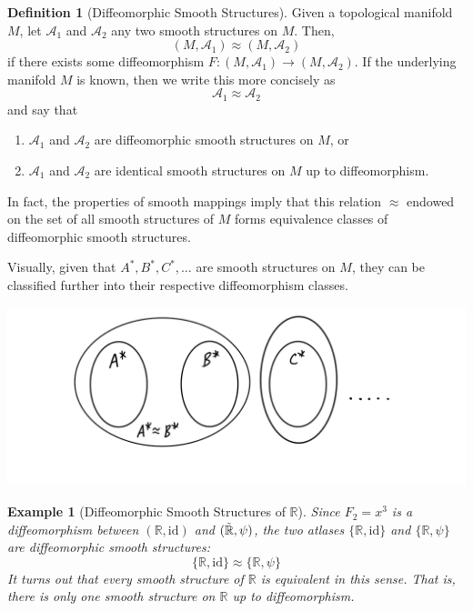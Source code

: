 \documentclass{article}
\newtheorem{example}{Example}[section]
\theoremstyle{remark}
\theoremstyle{definition}
\newtheorem{definition}{Definition}[section]
\begin{document}
\begin{definition}[Diffeomorphic Smooth Structures]
Given a topological manifold $M$, let $\mathcal{A}_1$ and $\mathcal{A}_2$ any two smooth structures on $M$. Then, 
\[(M, \mathcal{A}_1) \approx (M, \mathcal{A}_2)\]
if there exists some diffeomorphism $F: (M, \mathcal{A}_1) \longrightarrow (M, \mathcal{A}_2)$. If the underlying manifold $M$ is known, then we write this more concisely as
\[\mathcal{A}_1 \approx \mathcal{A}_2\]
and say that
\begin{enumerate}
    \item $\mathcal{A}_1$ and $\mathcal{A}_2$ are diffeomorphic smooth structures on $M$, or
    \item $\mathcal{A}_1$ and $\mathcal{A}_2$ are identical smooth structures on $M$ up to diffeomorphism.
\end{enumerate}
In fact, the properties of smooth mappings imply that this relation $\approx$ endowed on the set of all smooth structures of $M$ forms equivalence classes of diffeomorphic smooth structures. 

Visually, given that $A^*, B^*, C^*, \ldots$ are smooth structures on $M$, they can be classified further into their respective diffeomorphism classes. 
\begin{center}
    \includegraphics[scale=0.25]{img/Diffeomorphism_Classes.PNG}
\end{center}
\end{definition}

\begin{example}[Diffeomorphic Smooth Structures of $\mathbb{R}$]
Since $F_2 = x^3$ is a diffeomorphism between $(\mathbb{R}, \text{id})$ and $(\Tilde{\mathbb{R}}, \psi)$, the two atlases $\{\mathbb{R}, \text{id}\}$ and $\{\mathbb{R}, \psi\}$ are diffeomorphic smooth structures: 
\[\{\mathbb{R}, \text{id}\} \approx \{\mathbb{R}, \psi\}\]
It turns out that every smooth structure of $\mathbb{R}$ is equivalent in this sense. That is, there is only one smooth structure on $\mathbb{R}$ up to diffeomorphism. 
\end{example}
\end{document}
